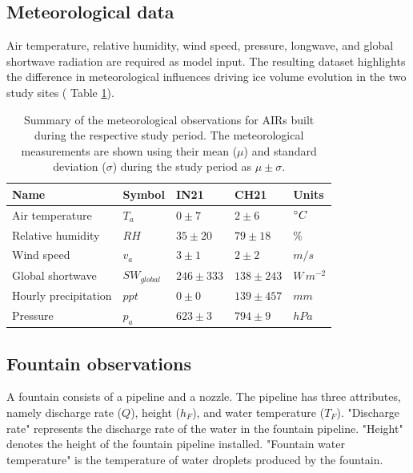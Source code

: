 \subsection{Meteorological data}

Air temperature, relative humidity, wind speed, pressure, longwave, and global shortwave radiation are required
as model input. The resulting dataset highlights the difference in meteorological influences driving ice
volume evolution in the two study sites ( Table \ref{tab:Observations}).

\begin{table}
	\centering
	\caption{Summary of the meteorological observations for \ac{AIRs} built during the respective study period.
		The meteorological measurements are shown using their mean ($\mu$) and standard deviation ($\sigma$) during the study
		period as $\mu \pm \sigma$. }

	\label{tab:Observations}
	\begin{tabular}{|lllll|}
		\hline
		\textbf{Name}        & \textbf{Symbol} & \textbf{IN21} & \textbf{CH21} & \textbf{Units} \\ \hline
		Air temperature      & $T_a    $       & $0 \pm 7$     & $2 \pm 6$     & $^{\circ} C$    \\
		Relative humidity    & $RH     $       & $35 \pm 20$   & $79 \pm 18$   & \%             \\
		Wind speed           & $v_a        $   & $3 \pm 1$     & $2 \pm 2$     & $m/s$          \\
		Global shortwave     & $SW_{global} $  & $246 \pm 333$ & $138 \pm 243$  & $W\,m^{-2}$    \\
		Hourly precipitation & $ppt        $   & $0 \pm 0$     & $139 \pm 457$ & $mm$           \\
		Pressure             & $p_a         $  & $623 \pm 3$   & $794 \pm 9$   & $hPa$          \\\hline
	\end{tabular}
\end{table}

\subsection{Fountain observations}

A fountain consists of a pipeline and a nozzle. The pipeline has three attributes, namely discharge rate
($Q$), height ($h_F$), and water temperature ($T_F$). "Discharge rate" represents the discharge rate of the water in
the fountain pipeline. "Height" denotes the height of the fountain pipeline installed. "Fountain water temperature"
is the temperature of water droplets produced by the fountain.

